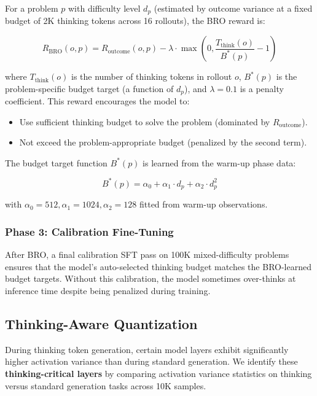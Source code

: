 \documentclass[11pt,a4paper]{article}
\begin{document}
For a problem $p$ with difficulty level $d_p$ (estimated by outcome variance at a
fixed budget of 2K thinking tokens across 16 rollouts), the BRO reward is:

\begin{equation}
R_{\text{BRO}}(o, p) = R_{\text{outcome}}(o, p) - \lambda \cdot \max\left(0,
\frac{T_{\text{think}}(o)}{B^*(p)} - 1\right)
\end{equation}

where $T_{\text{think}}(o)$ is the number of thinking tokens in rollout $o$,
$B^*(p)$ is the problem-specific budget target (a function of $d_p$), and
$\lambda = 0.1$ is a penalty coefficient. This reward encourages the model to:

\begin{itemize}
    \item Use sufficient thinking budget to solve the problem (dominated by $R_{\text{outcome}}$).
    \item Not exceed the problem-appropriate budget (penalized by the second term).
\end{itemize}

The budget target function $B^*(p)$ is learned from the warm-up phase data:

\begin{equation}
B^*(p) = \alpha_0 + \alpha_1 \cdot d_p + \alpha_2 \cdot d_p^2
\end{equation}

with $\alpha_0 = 512, \alpha_1 = 1024, \alpha_2 = 128$ fitted from warm-up observations.

\subsubsection{Phase 3: Calibration Fine-Tuning}

After BRO, a final calibration SFT pass on 100K mixed-difficulty problems ensures that
the model's auto-selected thinking budget matches the BRO-learned budget targets. Without
this calibration, the model sometimes over-thinks at inference time despite being penalized
during training.

\subsection{Thinking-Aware Quantization}

During thinking token generation, certain model layers exhibit significantly higher
activation variance than during standard generation. We identify these
\textbf{thinking-critical layers} by comparing activation variance statistics on
thinking versus standard generation tasks across 10K samples.
\end{document}
